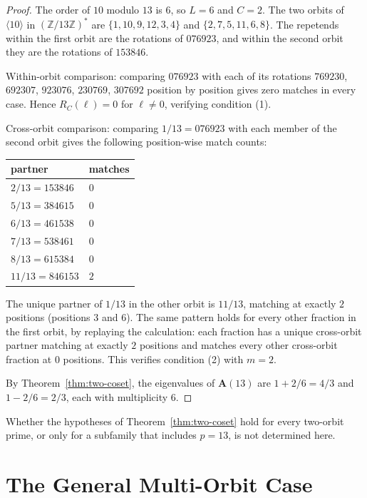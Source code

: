 \documentclass[12pt]{amsart}
\theoremstyle{definition}
\theoremstyle{remark}
\begin{document}
\begin{proof}
The order of $10$ modulo $13$ is $6$, so $L = 6$ and
$C = 2$. The two orbits of $\langle 10 \rangle$ in
$(\mathbb{Z}/13\mathbb{Z})^*$ are
$\{1, 10, 9, 12, 3, 4\}$ and $\{2, 7, 5, 11, 6, 8\}$. The
repetends within the first orbit are the rotations of
$076923$, and within the second orbit they are the rotations
of $153846$.

Within-orbit comparison: comparing $076923$ with each of its
rotations $769230$, $692307$, $923076$, $230769$, $307692$
position by position gives zero matches in every case.
Hence $R_C(\ell) = 0$ for $\ell \ne 0$, verifying
condition (1).

Cross-orbit comparison: comparing $1/13 = 076923$ with each
member of the second orbit gives the following position-wise
match counts:
\begin{center}
\begin{tabular}{ll}
\toprule
partner & matches \\
\midrule
$2/13 = 153846$ & $0$ \\
$5/13 = 384615$ & $0$ \\
$6/13 = 461538$ & $0$ \\
$7/13 = 538461$ & $0$ \\
$8/13 = 615384$ & $0$ \\
$11/13 = 846153$ & $2$ \\
\bottomrule
\end{tabular}
\end{center}
The unique partner of $1/13$ in the other orbit is $11/13$,
matching at exactly $2$ positions (positions $3$ and $6$).
The same pattern holds for every other fraction in the first
orbit, by replaying the calculation: each fraction has a
unique cross-orbit partner matching at exactly $2$ positions
and matches every other cross-orbit fraction at $0$
positions. This verifies condition (2) with $m = 2$.

By Theorem~\ref{thm:two-coset}, the eigenvalues of
$\mathbf{A}(13)$ are $1 + 2/6 = 4/3$ and $1 - 2/6 = 2/3$,
each with multiplicity $6$.
\end{proof}

Whether the hypotheses of Theorem~\ref{thm:two-coset}
hold for every two-orbit prime, or only for a subfamily
that includes $p = 13$, is not determined here.

\section{The General Multi-Orbit Case}\label{sec:multi-coset}
\end{document}
